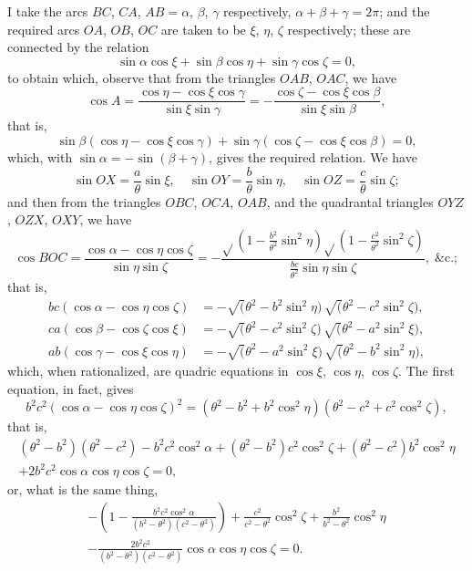 \documentclass[11pt,a4paper]{article}
\theoremstyle{plain}
\theoremstyle{definition}
\theoremstyle{remark}
\begin{document}
I take the arcs $BC$, $CA$, $AB = \alpha$, $\beta$, $\gamma$ respectively, $\alpha + \beta + \gamma = 2\pi$; and the required arcs $OA$, $OB$, $OC$ are taken to be $\xi$, $\eta$, $\zeta$ respectively; these are connected by the relation
\[
\sin\alpha\cos\xi + \sin\beta\cos\eta + \sin\gamma\cos\zeta = 0,
\]
to obtain which, observe that from the triangles $OAB$, $OAC$, we have
\[
\cos A = \frac{\cos\eta - \cos\xi\cos\gamma}{\sin\xi\sin\gamma} = -\frac{\cos\zeta - \cos\xi\cos\beta}{\sin\xi\sin\beta},
\]
that is,
\[
\sin\beta(\cos\eta - \cos\xi\cos\gamma) + \sin\gamma(\cos\zeta - \cos\xi\cos\beta) = 0,
\]
which, with $\sin\alpha = -\sin(\beta+\gamma)$, gives the required relation. We have
\[
\sin OX = \frac{a}{\theta}\sin\xi,\quad \sin OY = \frac{b}{\theta}\sin\eta,\quad \sin OZ = \frac{c}{\theta}\sin\zeta;
\]
and then from the triangles $OBC$, $OCA$, $OAB$, and the quadrantal triangles $OYZ$, $OZX$, $OXY$, we have
\[
\cos BOC = \frac{\cos\alpha - \cos\eta\cos\zeta}{\sin\eta\sin\zeta} = -\frac{\sqrt{}\left(1 - \frac{b^2}{\theta^2}\sin^2\eta\right)\sqrt{}\left(1 - \frac{c^2}{\theta^2}\sin^2\zeta\right)}{\frac{bc}{\theta^2}\sin\eta\sin\zeta},\; \&\text{c.};
\]
that is,
\begin{align*}
bc(\cos\alpha - \cos\eta\cos\zeta) &= -\surd(\theta^2 - b^2\sin^2\eta)\,\surd(\theta^2 - c^2\sin^2\zeta),\\
ca(\cos\beta - \cos\zeta\cos\xi) &= -\surd(\theta^2 - c^2\sin^2\zeta)\,\surd(\theta^2 - a^2\sin^2\xi),\\
ab(\cos\gamma - \cos\xi\cos\eta) &= -\surd(\theta^2 - a^2\sin^2\xi)\,\surd(\theta^2 - b^2\sin^2\eta),
\end{align*}
which, when rationalized, are quadric equations in $\cos\xi$, $\cos\eta$, $\cos\zeta$. The first equation, in fact, gives
\[
b^2c^2(\cos\alpha - \cos\eta\cos\zeta)^2 = (\theta^2 - b^2 + b^2\cos^2\eta)(\theta^2 - c^2 + c^2\cos^2\zeta),
\]
that is,
\begin{multline}
(\theta^2-b^2)(\theta^2-c^2) - b^2c^2\cos^2\alpha + (\theta^2-b^2)c^2\cos^2\zeta + (\theta^2-c^2)b^2\cos^2\eta\\
+ 2b^2c^2\cos\alpha\cos\eta\cos\zeta = 0,
\end{multline}
or, what is the same thing,
\begin{multline}
-\left(1 - \frac{b^2c^2\cos^2\alpha}{(b^2-\theta^2)(c^2-\theta^2)}\right) + \frac{c^2}{c^2-\theta^2}\cos^2\zeta + \frac{b^2}{b^2-\theta^2}\cos^2\eta\\
- \frac{2b^2c^2}{(b^2-\theta^2)(c^2-\theta^2)}\cos\alpha\cos\eta\cos\zeta = 0.
\end{multline}
\end{document}
